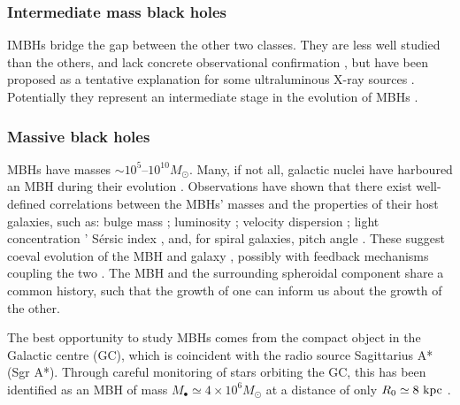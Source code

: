 \subsubsection{Intermediate mass black holes}

IMBHs bridge the gap between the other two classes. They are less well studied than the others, and lack concrete observational confirmation \citep{Miller2009a}, but have been proposed as a tentative explanation for some ultraluminous X-ray sources \citep{Feng2011}. Potentially they represent an intermediate stage in the evolution of MBHs \citep{Graham2013}.

\subsubsection{Massive black holes}

MBHs have masses $\sim10^5$--$10^{10} M_\odot$. Many, if not all, galactic nuclei have harboured an MBH during their evolution \citep{Lynden-Bell1971, Soltan1982, Rees1984}. Observations have shown that there exist well-defined correlations between the MBHs' masses and the properties of their host galaxies, such as: bulge mass \citep{Kormendy1995,Haring2004,Graham2012a}; luminosity \citep{Magorrian1998,Marconi2003,Graham2013}; velocity dispersion \citep{Ferrarese2000,Gebhardt2000,Tremaine2002,Graham2011}; light concentration \citep{Graham2001}' S{\'e}rsic index \citep{Graham2007a,Savorgnan2013}, and, for spiral galaxies, pitch angle \citep{Seigar2008,Berrier2013}. These suggest coeval evolution of the MBH and galaxy \citep{Peng2007, Jahnke2011}, possibly with feedback mechanisms coupling the two \citep{Haiman2004, Volonteri2009}. The MBH and the surrounding spheroidal component share a common history, such that the growth of one can inform us about the growth of the other.

The best opportunity to study MBHs comes from the compact object in the Galactic centre (GC), which is coincident with the radio source Sagittarius A* (Sgr A*). Through careful monitoring of stars orbiting the GC, this has been identified as an MBH of mass $M_\bullet \simeq 4 \times 10^6 M_\odot$ at a distance of only $R_0 \simeq 8~\mathrm{kpc}$ \citep{Gillessen2009, Meyer2012}.

